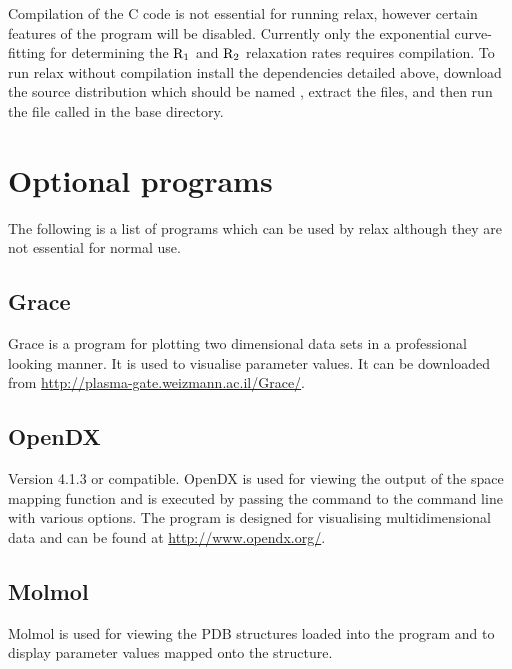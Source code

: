 Compilation of the C code is not essential for running relax, however certain features of the program will be disabled.
Currently only the exponential curve-fitting for determining the $\mathrm{R}_1$ and $\mathrm{R}_2$ relaxation rates requires compilation.
To run relax without compilation install the dependencies detailed above, download the source distribution which should be named , extract the files, and then run the file called  in the base directory.




\section{Optional programs}

The following is a list of programs which can be used by relax although they are not essential for normal use.


\subsection{Grace}

Grace is a program for plotting two dimensional data sets in a professional looking manner.
It is used to visualise parameter values.
It can be downloaded from \href{http://plasma-gate.weizmann.ac.il/Grace/}{http://plasma-gate.weizmann.ac.il/Grace/}.


\subsection{OpenDX}

Version 4.1.3 or compatible.
OpenDX is used for viewing the output of the space mapping function and is executed by passing the command  to the command line with various options.
The program is designed for visualising multidimensional data and can be found at \href{http://www.opendx.org/}{http://www.opendx.org/}.


\subsection{Molmol}

Molmol is used for viewing the PDB structures loaded into the program and to display parameter values mapped onto the structure.


